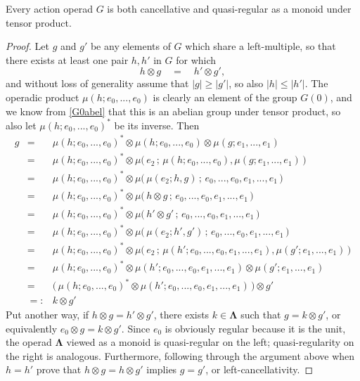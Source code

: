 \documentclass{amsbook} %
\newcommand{\ML}{\mathbf{\Lambda}}
\numberwithin{section}{chapter}
\begin{document}
\begin{prop} \label{cqr} Every action operad $G$ is both cancellative and quasi-regular as a monoid under tensor product.
\end{prop}
\begin{proof}
Let $g$ and $g'$ be any elements of $G$ which share a left-multiple, so that there exists at least one pair $h, h'$ in $G$ for which
\[ h \otimes g \quad = \quad h' \otimes g', \]
and without loss of generality assume that $|g| \ge |g'|$, so also $|h| \le |h'|$. The operadic product $\mu(h; e_0, ..., e_0)$ is clearly an element of the group $G(0)$, and we know from \cref{G0abel} that this is an abelian group under tensor product, so also let $\mu(h; e_0, ..., e_0)^*$ be its inverse. Then
\[ \begin{array}{rll}
			g & = & \mu(h; e_0, ..., e_0)^* \otimes \mu(h; e_0, ..., e_0) \otimes \mu(g; e_1, ..., e_1) \\
			& = & \mu(h; e_0, ..., e_0)^* \otimes \mu\big( \, e_2 \, ; \, \mu(h; e_0, ..., e_0), \mu(g; e_1, ..., e_1) \, \big) \\
			& = & \mu(h; e_0, ..., e_0)^* \otimes \mu\big( \, \mu(e_2; h, g) \, ; \, e_0, ..., e_0, e_1, ..., e_1 \, \big) \\
			& = & \mu(h; e_0, ..., e_0)^* \otimes \mu\big( \, h \otimes g \, ; \, e_0, ..., e_0, e_1, ..., e_1 \, \big) \\
			& = & \mu(h; e_0, ..., e_0)^* \otimes \mu\big( \, h' \otimes g' \, ; \, e_0, ..., e_0, e_1, ..., e_1 \, \big) \\
			& = & \mu(h; e_0, ..., e_0)^* \otimes \mu\big( \, \mu(e_2; h', g') \, ; \, e_0, ..., e_0, e_1, ..., e_1 \, \big) \\
			& = & \mu(h; e_0, ..., e_0)^* \otimes \mu\big( \, e_2 \, ; \, \mu(h'; e_0, ..., e_0, e_1, ..., e_1), \mu(g'; e_1, ..., e_1) \, \big) \\
			& = & \mu(h; e_0, ..., e_0)^* \otimes \mu(h'; e_0, ..., e_0, e_1, ..., e_1) \otimes \mu(g'; e_1, ..., e_1) \\
			& = & \big( \, \mu(h; e_0, ..., e_0)^* \otimes \mu(h'; e_0, ..., e_0, e_1, ..., e_1) \, \big) \otimes g' \\
			& =: & k \otimes g'
		\end{array}
\]
Put another way, if $h \otimes g = h' \otimes g'$, there exists $k \in \ML$ such that $g = k \otimes g'$, or equivalently $e_0 \otimes g = k \otimes g'$. Since
 $e_0$ is obviously regular because it is the unit, the operad $\ML$ viewed as a monoid is quasi-regular on the left; quasi-regularity on the right is analogous. Furthermore, following through the argument above when $h = h'$ prove that $h \otimes g = h \otimes g'$ implies $g = g'$, or left-cancellativity.
\end{proof}
\end{document}
